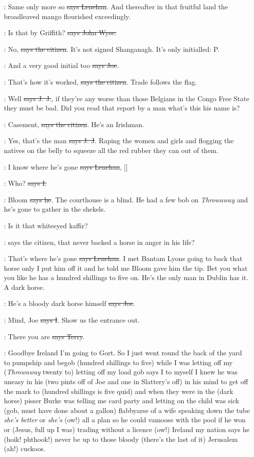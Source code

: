 \lenehan:
Same only more so \sout{says Lenehan}.
And thereafter in that fruitful land
the broadleaved mango flourished exceedingly.

\johnwyse:
Is that by Griffith?
\sout{says John Wyse.}

\citizen:
No, \sout{says the citizen}.
It's not signed Shanganagh. It's only
initialled: P.

\joe:
And a very good initial too \sout{says Joe}.

\citizen:
That's how it's worked, \sout{says the citizen}.
Trade follows the flag.

\jjom:
Well \sout{says J. J.},
if they're any worse than those Belgians in the Congo
Free State they must be bad. Did you read that report by a man what's this
his name is?

\citizen:
Casement, \sout{says the citizen}.
He's an Irishman.

\jjom:
Yes, that's the man \sout{says J. J}.
Raping the women and girls and flogging
the natives on the belly to squeeze all the red rubber they can out of
them.

\lenehan:
I know where he's gone \sout{says Lenehan},
[]

:
Who? \sout{says I.}

\lenehan:
Bloom \sout{says he}.
The courthouse is a blind. He had a few bob on
\emph{Throwaway} and he's gone to gather in the shekels.

\citizen:
Is it that whiteeyed kaffir?

\Nq:
says the citizen, that never backed a horse
in anger in his life?

\lenehan:
That's where he's gone \sout{says Lenehan}.
I met Bantam Lyons going to back
that horse only I put him off it and he told me Bloom gave him the tip.
Bet you what you like he has a hundred shillings to five on. He's the only
man in Dublin has it. A dark horse.

\joe:
He's a bloody dark horse himself \sout{says Joe}.

:
Mind, Joe \sout{says I}. Show us the entrance out.

\terry:
There you are \sout{says Terry}.

\Nq:
Goodbye Ireland I'm going to Gort. So I just went round the back of
the yard to pumpship and begob (hundred shillings to five) while I was
letting off my (\emph{Throwaway} twenty to) letting off my load gob says I to
myself I knew he was uneasy in his (two pints off of Joe and one in
Slattery's off) in his mind to get off the mark to (hundred shillings is
five quid) and when they were in the (dark horse) pisser Burke
was telling me card party and letting on the child was sick (gob, must
have done about a gallon) flabbyarse of a wife speaking down the tube
\emph{she's better} or \emph{she's} (ow!) all a plan so he could vamoose with the
pool if he won or (Jesus, full up I was) trading without a licence (ow!)
Ireland my nation says he (hoik! phthook!) never be up to those
bloody (there's the last of it) Jerusalem (ah!) cuckoos.

